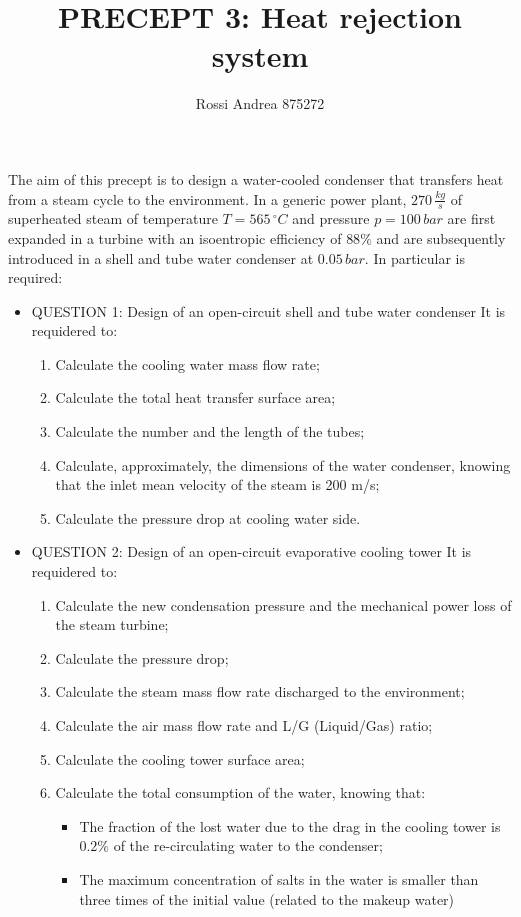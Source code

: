 \documentclass[a4paper,12pt]{article}
\title{\textbf{PRECEPT 3}: Heat rejection system}
\author{Rossi Andrea 875272}
\date{}
\newcommand{\celsius}[0]{\,^{\circ}C}
\newcommand{\kgs}[0]{\,\frac{kg}{s}}
\begin{document}
\maketitle

The aim of this precept is to design a water-cooled condenser that transfers heat from a steam cycle to the environment. In a generic power plant, $270 \kgs$ of superheated steam of temperature $T=565 \celsius$ and pressure $p=100\, bar$ are first expanded in a turbine with an isoentropic efficiency of $88\%$ and are subsequently introduced in a shell and tube water condenser at $0.05\, bar$. In particular is required:

\begin{itemize}
\item QUESTION 1: Design of an open-circuit shell and tube water condenser
It is requidered to:
\begin{enumerate}[label=\Alph*.]
\item Calculate the cooling water mass flow rate;
\item Calculate the total heat transfer surface area;
\item Calculate the number and the length of the tubes;
\item Calculate, approximately, the dimensions of the water condenser, knowing that the inlet mean velocity of the steam is 200 m/s; 
\item Calculate the pressure drop at cooling water side. 
\end{enumerate}
\item QUESTION 2: Design of an open-circuit evaporative cooling tower 
It is requidered to:
\begin{enumerate}[label=\Alph*.]
\item Calculate the new condensation pressure and the mechanical power loss of the steam turbine; 
\item Calculate the pressure drop;
\item Calculate the steam mass flow rate discharged to the environment;
\item Calculate the air mass flow rate and L/G (Liquid/Gas) ratio;
\item Calculate the cooling tower surface area;
\item Calculate the total consumption of the water, knowing that:
\begin{itemize}
\item The fraction of the lost water due to the drag in the cooling tower is $0.2\%$ of the re-circulating water to the condenser;
\item The maximum concentration of salts in the water is smaller than three times of the initial value (related to the makeup water) 
\end{itemize}
\end{enumerate}
\end{itemize}
\end{document}

